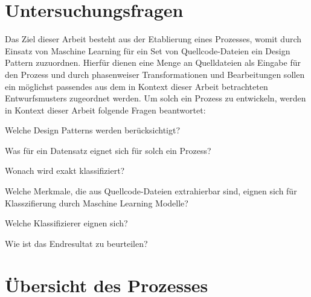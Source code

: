 \newpage

\section{Untersuchungsfragen}

Das Ziel dieser Arbeit besteht aus der Etablierung eines Prozesses, womit durch Einsatz von Maschine Learning für ein Set von Quellcode-Dateien ein Design Pattern zuzuordnen.
Hierfür dienen eine Menge an Quelldateien als Eingabe für den Prozess und durch phasenweiser Transformationen und Bearbeitungen sollen ein möglichst passendes aus dem in Kontext dieser Arbeit betrachteten Entwurfsmusters zugeordnet werden.
Um solch ein Prozess zu entwickeln, werden in Kontext dieser Arbeit folgende Fragen beantwortet:

\begin{questions}
    \item Welche Design Patterns werden berücksichtigt?
    \item\label{RQ2} Was für ein Datensatz eignet sich für solch ein Prozess?
    \item Wonach wird exakt klassifiziert?
    \item Welche Merkmale, die aus Quellcode-Dateien extrahierbar sind, eignen sich für Klasszifierung durch Maschine Learning Modelle?  
    \item Welche Klassifizierer eignen sich?
    \item Wie ist das Endresultat zu beurteilen?
\end{questions}

\section{Übersicht des Prozesses}

